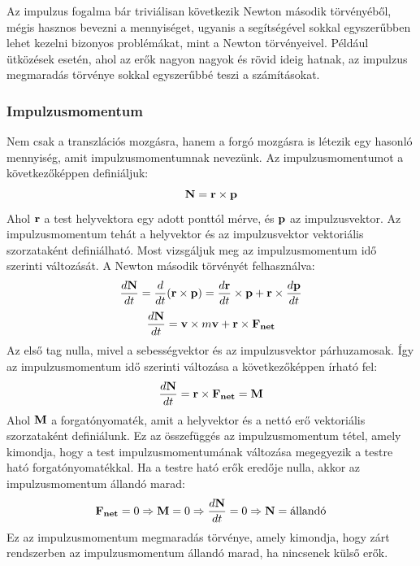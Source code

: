 \documentclass[a4paper,12pt]{article}
\begin{document}
Az impulzus fogalma bár triviálisan következik Newton második törvényéből, mégis hasznos bevezni a mennyiséget, ugyanis a segítségével sokkal egyszerűbben lehet kezelni bizonyos problémákat, mint a Newton törvényeivel.
Például ütközések esetén, ahol az erők nagyon nagyok és rövid ideig hatnak, az impulzus megmaradás törvénye sokkal egyszerűbbé teszi a számításokat.

\subsubsection{Impulzusmomentum}
Nem csak a transzlációs mozgásra, hanem a forgó mozgásra is létezik egy hasonló mennyiség, amit impulzusmomentumnak nevezünk. Az impulzusmomentumot a következőképpen definiáljuk:
\begin{equation}
    \bold{N} = \bold{r} \times \bold{p}
\end{equation}
Ahol $\bold{r}$ a test helyvektora egy adott ponttól mérve, és $\bold{p}$ az impulzusvektor. Az impulzusmomentum tehát a helyvektor és az impulzusvektor vektoriális szorzataként definiálható.
Most vizsgáljuk meg az impulzusmomentum idő szerinti változását. A Newton második törvényét felhasználva:
\begin{equation}
    \frac{d\bold{N}}{dt} = \frac{d}{dt}(\bold{r} \times \bold{p}) = \frac{d\bold{r}}{dt} \times \bold{p} + \bold{r} \times \frac{d\bold{p}}{dt}
\end{equation}
\begin{equation}
    \frac{d\bold{N}}{dt} = \bold{v} \times m\bold{v} + \bold{r} \times \bold{F_{net}}
\end{equation}
Az első tag nulla, mivel a sebességvektor és az impulzusvektor párhuzamosak. Így az impulzusmomentum idő szerinti változása a következőképpen írható fel:
\begin{equation}
    \frac{d\bold{N}}{dt} = \bold{r} \times \bold{F_{net}} = \bold{M}
\end{equation}
Ahol $\bold{M}$ a forgatónyomaték, amit a helyvektor és a nettó erő vektoriális szorzataként definiálunk. Ez az összefüggés az impulzusmomentum tétel, amely kimondja, hogy a test impulzusmomentumának változása megegyezik a testre ható forgatónyomatékkal.
Ha a testre ható erők eredője nulla, akkor az impulzusmomentum állandó marad:
\begin{equation}
    \bold{F_{net}} = 0 \Rightarrow \bold{M} = 0 \Rightarrow \frac{d\bold{N}}{dt} = 0 \Rightarrow \bold{N} = \text{állandó}
\end{equation}
Ez az impulzusmomentum megmaradás törvénye, amely kimondja, hogy zárt rendszerben az impulzusmomentum állandó marad, ha nincsenek külső erők.
\end{document}
